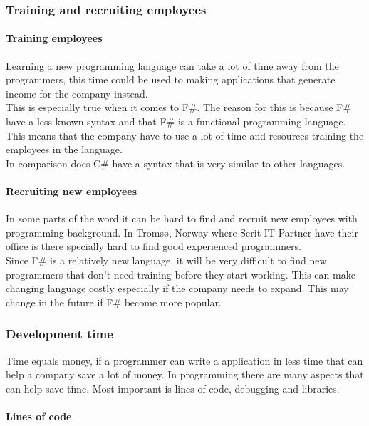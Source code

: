 \documentclass[12pt, a4paper]{article}
\begin{document}
\newpage
\subsubsection{Training and recruiting employees}

\paragraph{Training employees}
Learning a new programming language can take a lot of time away from the programmers, this time could be used to making applications that generate income for the company instead.\\

This is especially true when it comes to F\#. The reason for this is because F\# have a less known syntax and that F\# is a functional programming language. This means that the company have to use a lot of time and resources training the employees in the language.\\

In comparison does C\# have a syntax that is very similar to other languages.

\paragraph{Recruiting new employees}
In some parts of the word it can be hard to find and recruit new employees with programming background. In Tromsø, Norway where Serit IT Partner have their office is there specially hard to find good experienced programmers.\\

Since F\# is a relatively new language, it will be very difficult to find new programmers that don't need training before they start working. This can make changing language costly especially if the company needs to expand. This may change in the future if F\# become more popular.

\newpage
\subsubsection{Development time}
Time equals money, if a programmer can write a application in less time that can help a company save a lot of money. In programming there are many aspects that can help save time. Most important is lines of code, debugging and libraries. 

\paragraph{Lines of code}
\end{document}
